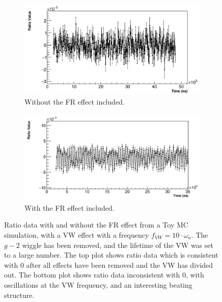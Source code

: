 \documentclass[12pt,letterpaper]{article}
\def\gmtwo{$g-2$\xspace}
\begin{document}
\begin{figure}[]
\centering
    \begin{subfigure}[t]{0.7\textwidth}
        \centering
        \includegraphics[width=\textwidth]{JamesMC_noFR}
        \caption{Without the FR effect included.}
    \end{subfigure}%

    \begin{subfigure}[t]{0.7\textwidth}
        \centering
        \includegraphics[width=\textwidth]{JamesMC_withFR}
        \caption{With the FR effect included.}
    \end{subfigure}
\caption[]{Ratio data with and without the FR effect from a Toy MC simulation, with a VW effect with a frequency $f_{VW} = 10 \cdot \omega_{a}$. The \gmtwo wiggle has been removed, and the lifetime of the VW was set to a large number. The top plot shows ratio data which is consistent with 0 after all effects have been removed and the VW has divided out. The bottom plot shows ratio data inconsistent with 0, with oscillations at the VW frequency, and an interesting beating structure.}
\label{fig:JamesMC_VW_FR}
\end{figure}
\end{document}
